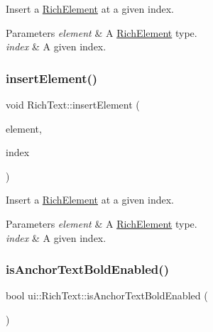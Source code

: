 Insert a \hyperlink{classui_1_1RichElement}{Rich\+Element} at a given index. 


\begin{DoxyParams}{Parameters}
{\em element} & A \hyperlink{classui_1_1RichElement}{Rich\+Element} type. \\
\hline
{\em index} & A given index. \\
\hline
\end{DoxyParams}
\mbox{\label{classui_1_1RichText_a7275315b5e730c96a4e9b39e18c2cb9e}} 
\subsubsection{\texorpdfstring{insert\+Element()}{insertElement()}\hspace{0.1cm}{\footnotesize\ttfamily [2/2]}}
{\footnotesize\ttfamily void Rich\+Text\+::insert\+Element (\begin{DoxyParamCaption}\item[{\hyperlink{classui_1_1RichElement}{Rich\+Element} $\ast$}]{element,  }\item[{int}]{index }\end{DoxyParamCaption})}



Insert a \hyperlink{classui_1_1RichElement}{Rich\+Element} at a given index. 


\begin{DoxyParams}{Parameters}
{\em element} & A \hyperlink{classui_1_1RichElement}{Rich\+Element} type. \\
\hline
{\em index} & A given index. \\
\hline
\end{DoxyParams}
\mbox{\label{classui_1_1RichText_a823f58bcacdb897d067e3fb6ab7b06d0}} 
\subsubsection{\texorpdfstring{is\+Anchor\+Text\+Bold\+Enabled()}{isAnchorTextBoldEnabled()}\hspace{0.1cm}{\footnotesize\ttfamily [1/2]}}
{\footnotesize\ttfamily bool ui\+::\+Rich\+Text\+::is\+Anchor\+Text\+Bold\+Enabled (\begin{DoxyParamCaption}{ }\end{DoxyParamCaption})}

